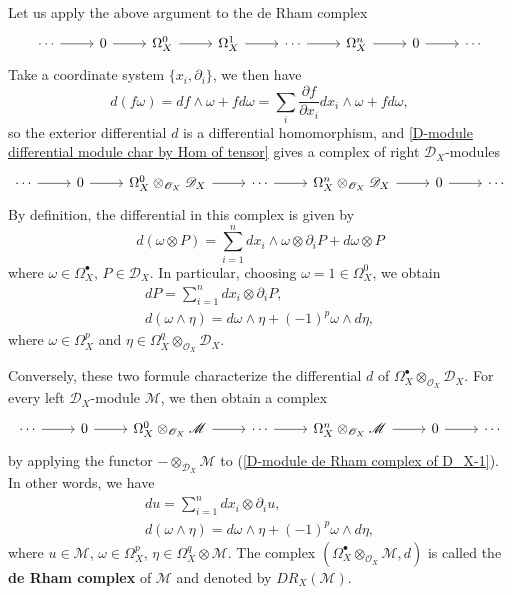 Let us apply the above argument to the de Rham complex
\[\begin{tikzcd}
\cdots\ar[r]&0\ar[r]&\Omega_X^0\ar[r]&\Omega_X^1\ar[r]&\cdots\ar[r]&\Omega_X^n\ar[r]&0\ar[r]&\cdots
\end{tikzcd}\]
Take a coordinate system $\{x_i,\partial_i\}$, we then have
\[d(f\omega)=df\wedge\omega+fd\omega=\sum_i\frac{\partial f}{\partial x_i}dx_i\wedge\omega+fd\omega,\]
so the exterior differential $d$ is a differential homomorphism, and \cref{D-module differential module char by Hom of tensor} gives a complex of right $\mathscr{D}_X$-modules
\begin{equation}\label{D-module de Rham complex of D_X-1}
\begin{tikzcd}
\cdots\ar[r]&0\ar[r]&\Omega_X^0\otimes_{\mathscr{O}_X}\mathscr{D}_X\ar[r]&\cdots\ar[r]&\Omega_X^n\otimes_{\mathscr{O}_X}\mathscr{D}_X\ar[r]&0\ar[r]&\cdots
\end{tikzcd}
\end{equation}
By definition, the differential in this complex is given by
\begin{equation}\label{D-module de Rham complex of D_X-2}
d(\omega\otimes P)=\sum_{i=1}^{n}dx_i\wedge \omega\otimes\partial_iP+d\omega\otimes P
\end{equation}  
where $\omega\in\Omega_X^\bullet$, $P\in\mathscr{D}_X$. In particular, choosing $\omega=1\in\Omega_X^0$, we obtain
\begin{gather}
dP=\sum_{i=1}^{n}dx_i\otimes\partial_iP,\label{D-module de Rham complex of D_X-3}\\
d(\omega\wedge\eta)=d\omega\wedge\eta+(-1)^p\omega\wedge d\eta,\label{D-module de Rham complex of D_X-4}
\end{gather}
where $\omega\in\Omega_X^p$ and $\eta\in\Omega_X^q\otimes_{\mathscr{O}_X}\mathscr{D}_X$.\par 

Conversely, these two formule characterize the differential $d$ of $\Omega_X^\bullet\otimes_{\mathscr{O}_X}\mathscr{D}_X$. For every left $\mathscr{D}_X$-module $\mathscr{M}$, we then obtain a complex
\[\begin{tikzcd}
\cdots\ar[r]&0\ar[r]&\Omega_X^0\otimes_{\mathscr{O}_X}\mathscr{M}\ar[r]&\cdots\ar[r]&\Omega_X^n\otimes_{\mathscr{O}_X}\mathscr{M}\ar[r]&0\ar[r]&\cdots
\end{tikzcd}\]
by applying the functor $-\otimes_{\mathscr{D}_X}\mathscr{M}$ to (\ref{D-module de Rham complex of D_X-1}). In other words, we have
\begin{gather}
du=\sum_{i=1}^{n}dx_i\otimes\partial_iu,\label{D-module de Rham complex of module-1}\\
d(\omega\wedge\eta)=d\omega\wedge\eta+(-1)^p\omega\wedge d\eta,\label{D-module de Rham complex ofmodule-2}
\end{gather}
where $u\in\mathscr{M}$, $\omega\in\Omega_X^p$, $\eta\in\Omega_X^q\otimes\mathscr{M}$. The complex $(\Omega_X^\bullet\otimes_{\mathscr{O}_X}\mathscr{M},d)$ is called the \textbf{de Rham complex} of $\mathscr{M}$ and denoted by $DR_X(\mathscr{M})$.\par

